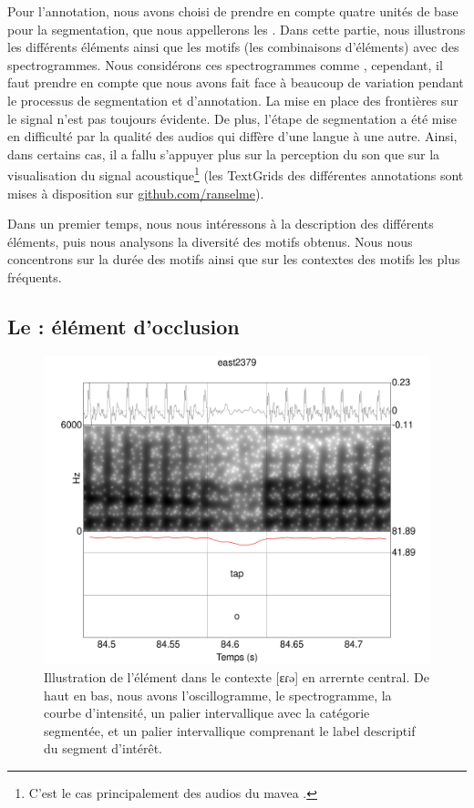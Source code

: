 Pour l'annotation, nous avons choisi de prendre en compte quatre unités de base pour la segmentation, que nous appellerons les .
Dans cette partie, nous illustrons les différents éléments ainsi que les motifs (les combinaisons d'éléments) avec des spectrogrammes. Nous considérons ces spectrogrammes comme , cependant, il faut prendre en compte que nous avons fait face à beaucoup de variation pendant le processus de segmentation et d'annotation. La mise en place des frontières sur le signal n'est pas toujours évidente. De plus, l'étape de segmentation a été mise en difficulté par la qualité des audios qui diffère d'une langue à une autre. Ainsi, dans certains cas, il a fallu s'appuyer plus sur la perception du son que sur la visualisation du signal acoustique\footnote{C'est le cas principalement des audios du mavea .} (les TextGrids des différentes annotations sont mises à disposition sur \href{https://github.com/ranselme}{github.com/ranselme}).

Dans un premier temps, nous nous intéressons à la description des différents éléments, puis nous analysons la diversité des motifs obtenus. Nous nous concentrons sur la durée des motifs ainsi que sur les contextes des motifs les plus fréquents.

\subsection{Le  : élément d'occlusion}

\begin{figure}
	\centering
	\includegraphics[width=0.8\linewidth]{substance/spectro_images/east2379_584_ɛrə}
	\caption[Illustration de l'élément ]{Illustration de l'élément  dans le contexte [ɛɾə] en arrernte central. De haut en bas, nous avons l'oscillogramme, le spectrogramme, la courbe d'intensité, un palier intervallique avec la catégorie segmentée, et un palier intervallique comprenant le label descriptif du segment d'intérêt.}
	\label{fig:east2379584r}
\end{figure}


